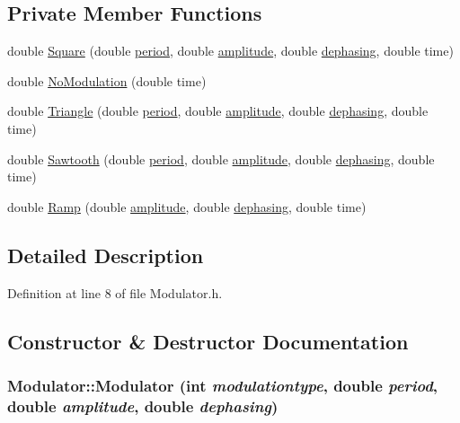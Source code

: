 \subsection*{Private Member Functions}
\begin{DoxyCompactItemize}
\item 
double \hyperlink{classModulator_ab9afc76dd8c1d81fd00124f3c67c84de}{Square} (double \hyperlink{classModulator_af9a5cbb6681a9493f97ad0a2104b883f}{period}, double \hyperlink{classModulator_a4c384ef6fe79785c8750710ae2dc5be6}{amplitude}, double \hyperlink{classModulator_aa24a21030bcf630c28a63506e07e3f3a}{dephasing}, double time)
\item 
double \hyperlink{classModulator_ae4aad8a94064186640f143bc2c0826ac}{NoModulation} (double time)
\item 
double \hyperlink{classModulator_a748c0bcd662d36b89544960401e24f72}{Triangle} (double \hyperlink{classModulator_af9a5cbb6681a9493f97ad0a2104b883f}{period}, double \hyperlink{classModulator_a4c384ef6fe79785c8750710ae2dc5be6}{amplitude}, double \hyperlink{classModulator_aa24a21030bcf630c28a63506e07e3f3a}{dephasing}, double time)
\item 
double \hyperlink{classModulator_a710b4f4fdd09c17dd017783e3b4ac9d7}{Sawtooth} (double \hyperlink{classModulator_af9a5cbb6681a9493f97ad0a2104b883f}{period}, double \hyperlink{classModulator_a4c384ef6fe79785c8750710ae2dc5be6}{amplitude}, double \hyperlink{classModulator_aa24a21030bcf630c28a63506e07e3f3a}{dephasing}, double time)
\item 
double \hyperlink{classModulator_ab043a19a9057fec4a0b6199ad82bf20b}{Ramp} (double \hyperlink{classModulator_a4c384ef6fe79785c8750710ae2dc5be6}{amplitude}, double \hyperlink{classModulator_aa24a21030bcf630c28a63506e07e3f3a}{dephasing}, double time)
\end{DoxyCompactItemize}


\subsection{Detailed Description}


Definition at line 8 of file Modulator.h.



\subsection{Constructor \& Destructor Documentation}
\hypertarget{classModulator_a9988f2b9041384d86b58fd8ff6a2ab30}{
\subsubsection[{Modulator}]{\setlength{\rightskip}{0pt plus 5cm}Modulator::Modulator (int {\em modulationtype}, \/  double {\em period}, \/  double {\em amplitude}, \/  double {\em dephasing})}}
\label{classModulator_a9988f2b9041384d86b58fd8ff6a2ab30}


